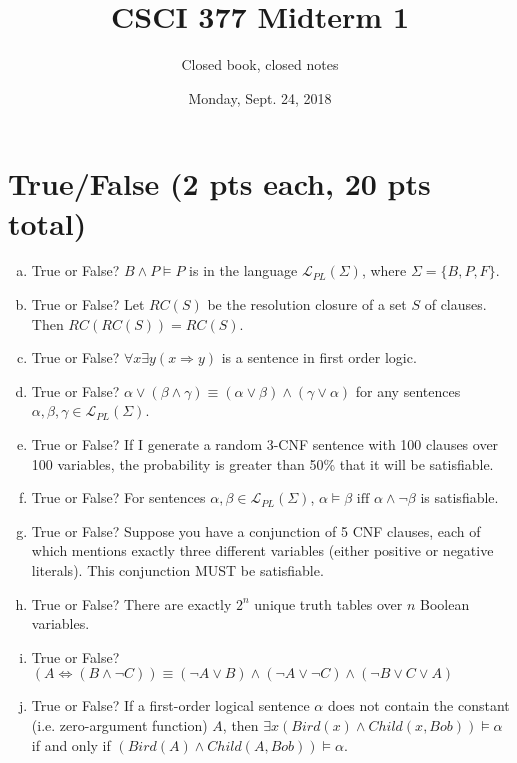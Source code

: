 \documentclass{article}
\title{CSCI 377 Midterm 1}
\date{Monday, Sept. 24, 2018}
\begin{document}
\author{Closed book, closed notes}

\maketitle


\section{True/False (2 pts each, 20 pts total)}

\begin{enumerate}[(a)]
\item True or False? $B \land P \models P$ is in the language $\mathcal{L}_{PL}(\Sigma)$, where $\Sigma = \{B, P, F\}$. 
\item True or False? Let $RC(S)$ be the resolution closure of a set $S$ of clauses. Then $RC(RC(S)) = RC(S)$. 
\item True or False? $\forall x \exists y  (x \Rightarrow y)$ is a sentence in first order logic.
\item True or False? $\alpha \lor (\beta \land \gamma) \equiv (\alpha \lor \beta) \land (\gamma \lor \alpha)$ for any sentences $\alpha, \beta, \gamma \in \mathcal{L}_{PL}(\Sigma)$.
\item True or False? If I generate a random 3-CNF sentence with 100 clauses over 100 variables, the probability is greater than 50\% that it will be satisfiable.
\item True or False? For sentences $\alpha, \beta \in \mathcal{L}_{PL}(\Sigma)$, $\alpha \models \beta \mbox{ iff } \alpha \land \lnot \beta$ is satisfiable.
\item True or False? Suppose you have a conjunction of 5 CNF clauses, each of which mentions exactly three different variables (either positive or negative literals). This conjunction MUST be satisfiable.
\item True or False? There are exactly $2^n$ unique truth tables over $n$ Boolean variables.
\item True or False? $(A \Leftrightarrow (B \land \lnot C)) \equiv (\lnot A \lor B) \land (\lnot A \lor \lnot C) \land (\lnot B \lor C \lor A)$
\item True or False? If a first-order logical sentence $\alpha $ does not contain the constant (i.e. zero-argument function) $A$, then $\exists x (Bird(x) \land Child(x, Bob)) \models \alpha $ if and only if $(Bird(A) \land Child(A, Bob)) \models \alpha$.
\end{enumerate}
\end{document}
